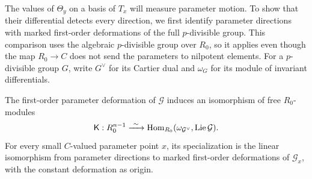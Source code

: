 The values of $\Theta_y$ on a basis of $T_x$ will measure parameter
motion.  To show that their differential detects every direction, we
first identify parameter directions with marked first-order deformations
of the full $p$-divisible group.  This comparison uses the algebraic
$p$-divisible group over $R_0$, so it applies even though the map
$R_0\to C$ does not send the parameters to nilpotent elements.
For a $p$-divisible group $G$, write $G^\vee$ for its Cartier dual and
$\omega_G$ for its module of invariant differentials.

\begin{proposition}\label{def:ks}
The first-order parameter deformation of $\mathcal G$ induces an
isomorphism of free $R_0$-modules
\[
 \mathsf K:R_0^{n-1}\xrightarrow{\ \sim\ }
       \operatorname{Hom}_{R_0}(\omega_{\mathcal G^\vee},\operatorname{Lie}\mathcal G).
\]
For every small $C$-valued parameter point $x$, its specialization is the
linear isomorphism from parameter directions to marked first-order
deformations of $\mathcal G_x$, with the constant deformation as origin.
\end{proposition}

